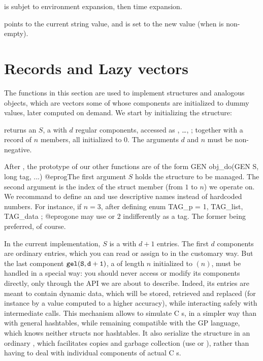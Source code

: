\item {} is subjet to environment expansion, then time expansion.

\item {} points to the current string value, and is set to the new
value (when  is non-empty).

\section{Records and Lazy vectors}
The functions in this section are used to implement  structures and
analogous objects, which are vectors some of whose components are initialized
to dummy values, later computed on demand. We start by initializing the
structure:

 returns an  $S$, a 
with $d$ regular components, accessed as , \dots,
; together with a record of $n$ members, all initialized to
$0$. The arguments $d$ and $n$ must be non-negative.

After , the prototype of our other functions are of
the form
\bprog
  GEN obj_do(GEN S, long tag, ...)
@eprog\noindent The first argument $S$ holds the structure to be managed.
The second argument  is the index of the struct member (from $1$ to
$n$) we operate on. We recommand to define an  and use descriptive
names instead of hardcoded numbers. For instance, if $n = 3$, after defining
\bprog
  enum { TAG_p = 1, TAG_list, TAG_data };
@eprog\noindent one may use  or $2$ indifferently as a tag.
The former being preferred, of course.

In the current implementation, $S$ is a  with $d+1$ entries.
The first $d$ components are ordinary  entries, which you can
read or assign to in the customary way. But the last component ${\tt gel(S,
d+1)}$, a  of length $n$ initialized to $(n)$, must
be handled in a special way: you should never access or modify its components
directly, only through the API we are about to describe. Indeed, its entries
are meant to contain dynamic data, which will be stored, retrieved and
replaced (for instance by a value computed to a higher accuracy), while
interacting safely with intermediate  calls. This mechanism
allows to simulate C s, in a simpler way than with general
hashtables, while remaining compatible with the GP language, which knows
neither structs nor hashtables. It also serialize the structure in an
ordinary , which facilitates copies and garbage collection (use
 or ), rather than having to deal with individual
components of actual C s.


